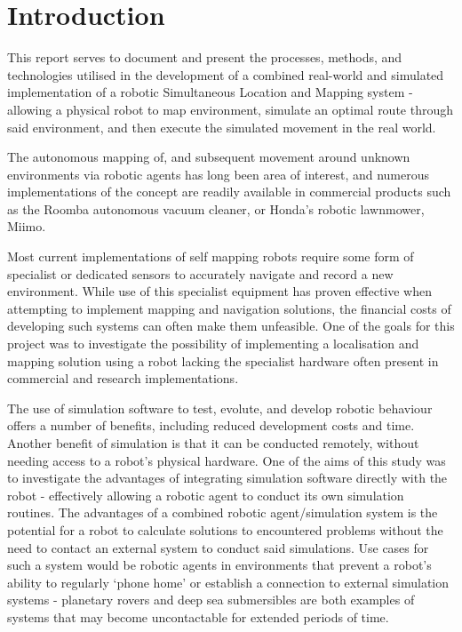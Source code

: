 \pagestyle{fancy}
\section{Introduction} \label{sec_introduction}
This report serves to document and present the processes, methods, and
technologies utilised in the development of a combined real-world and
simulated implementation of a robotic Simultaneous Location and Mapping
system - allowing a physical robot to map environment, simulate an optimal
route through said environment, and then execute the simulated movement in the
real world.

The autonomous mapping of, and subsequent movement around unknown environments
via robotic agents has long been area of interest, and numerous
implementations of the concept are readily available in commercial products
such as the Roomba autonomous vacuum cleaner, or Honda's robotic lawnmower,
Miimo.

Most current implementations of self mapping robots require some form of
specialist or dedicated sensors to accurately navigate and record a new
environment.
While use of this specialist equipment has proven effective when attempting
to implement  mapping and navigation solutions, the financial costs of
developing such systems can often make them unfeasible.
One of the goals for this project was to investigate the possibility of
implementing a localisation and mapping solution using a robot lacking
the specialist hardware often present in commercial and research
implementations.

The use of simulation software to test, evolute, and develop robotic behaviour
offers a number of benefits, including reduced development costs and time.
Another benefit of simulation is that it can be conducted remotely, without
needing access to a robot's physical hardware.
One of the aims of this study was to investigate the advantages of integrating
simulation software directly with the robot - effectively allowing a
robotic agent to conduct its own simulation routines.
The advantages of a combined robotic agent/simulation system is the potential
for a robot to calculate solutions to encountered problems without the need to
contact an external system to conduct said simulations.
Use cases for such a system would be robotic agents in environments that
prevent a robot's ability to regularly `phone home' or establish a connection
to  external simulation systems - planetary rovers and deep sea submersibles
are both examples of systems that may become uncontactable for extended
periods of time.


